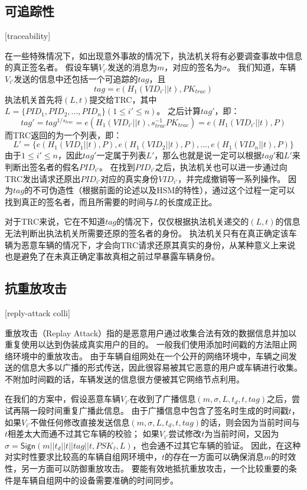 \subsection{可追踪性}[traceability]

在一些特殊情况下，如出现意外事故的情况下，执法机关将有必要调查事故中信息的真正签名者。
假设车辆$V_{i'}$发送的消息为$m$，对应的签名为$\sigma$。
我们知道，车辆$V_{i'}$发送的信息中还包括一个可追踪的$tag$，且
\begin{equation}
tag=e(H_1(VID_{i'}||t),PK_{trac})
\end{equation}
执法机关首先将$(L,t)$提交给TRC，其中$L=\{PID_1,PID_2,...,PID_n\}(1\leq i'\leq n)$。
之后计算$tag'$，即：
\begin{equation}
tag'=tag^{1/s_{trac}}=e(H_1(VID_{i'}||t),s_{trac}^{-1}PK_{trac})=e(H_1(VID_{i'}||t),P)
\end{equation}
而TRC返回的为一个列表，即：
\begin{equation}
L'=\{e(H_1(VID_1||t),P),e(H_1(VID_2||t),P),...,e(H_1(VID_n||t),P)\}
\end{equation}
由于$1\leq i'\leq n$，因此$tag'$一定属于列表$L'$，那么也就是说一定可以根据$tag'$和$L'$来判断出签名者的假名$PID_{i'}$。
在找到$PID_{i'}$之后，执法机关也可以进一步通过向TRC发出请求还原出$PID_{i'}$对应的真实身份$VID_{i'}$，并完成撤销等一系列操作。
因为$tag$的不可伪造性（根据前面的论述以及HSM的特性），通过这个过程一定可以找到真正的签名者，而且所需要的时间与$L$的长度成正比。

对于TRC来说，它在不知道$tag$的情况下，仅仅根据执法机关递交的$(L,t)$的信息无法判断出执法机关所需要还原的签名者的身份。
执法机关只有在真正确定该车辆为恶意车辆的情况下，才会向TRC请求还原其真实的身份，从某种意义上来说也是避免了在未真正确定事故真相之前过早暴露车辆身份。

\subsection{抗重放攻击}[reply-attack colli]

重放攻击（Replay Attack）指的是恶意用户通过收集合法有效的数据信息并加以重复使用以达到伪装成真实用户的目的。
一般我们使用添加时间戳的方法阻止网络环境中的重放攻击。
由于车辆自组网处在一个公开的网络环境中，车辆之间发送的信息大多以广播的形式传送，因此很容易被其它恶意的用户或车辆进行收集。不附加时间戳的话，车辆发送的信息很方便被其它网络节点利用。

在我们的方案中，假设恶意车辆$V_{i'}$在收到了广播信息$(m,\sigma,L,t_d,t,tag)$之后，尝试再隔一段时间重复广播此信息。
由于广播信息中包含了签名时生成的时间戳$t$，如果$V_{i'}$不做任何修改直接发送信息$(m,\sigma,L,t_d,t,tag)$的话，则会因为当前时间与$t$相差太大而通不过其它车辆的校验；
如果$V_{i'}$尝试修改$t$为当前时间，又因为$\sigma=\mathsf{Sign}(m||t_d||t||tag||t,PSK_\ell,L)$，也会通不过其它车辆的验证。
因此，在这种对实时性要求比较高的车辆自组网环境中，$t$的存在一方面可以确保消息$m$的时效性，另一方面可以防御重放攻击。
要能有效地抵抗重放攻击，一个比较重要的条件是车辆自组网中的设备需要准确的时间同步。

